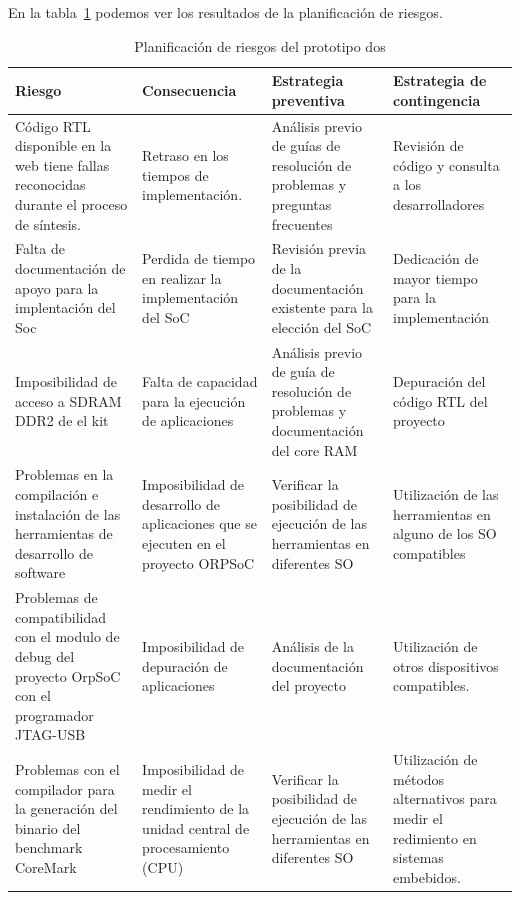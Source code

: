 En la tabla~\ref{tab:planificación2} podemos ver los resultados de la planificación de riesgos.
\clearpage
 		\begin{table}[h!]
		\centering
		\begin{tabular}{ p{4cm} p{4cm} p{4cm} p{3cm} }
		\hline 
		\rowcolor[gray]{0.8} Riesgo & Consecuencia & Estrategia preventiva & Estrategia de contingencia\\
		\hline
	Código RTL disponible en la web tiene fallas reconocidas durante el proceso de síntesis.&Retraso en los tiempos de implementación.& Análisis previo de guías de resolución de problemas y preguntas frecuentes & Revisión de código y consulta a los desarrolladores \\		 
		\hline
		Falta de documentación de apoyo para la implentación
del Soc& Perdida de tiempo en realizar la implementación
del SoC & Revisión previa de la documentación existente para la elección del
SoC & Dedicación de mayor tiempo para la implementación\\ 
		\hline
		 Imposibilidad de acceso a SDRAM DDR2 de el kit & Falta de capacidad para la ejecución de aplicaciones & Análisis previo de guía de resolución de problemas y documentación del core RAM & Depuración del código RTL del proyecto\\
		\hline
		Problemas en la compilación e instalación de las herramientas de desarrollo de software & Imposibilidad de desarrollo de aplicaciones que se ejecuten en el proyecto ORPSoC & Verificar la posibilidad de ejecución de las herramientas en diferentes SO & Utilización de las herramientas en alguno de los SO compatibles\\			
		\hline
		Problemas de compatibilidad con el modulo de debug del proyecto OrpSoC con el programador JTAG-USB & Imposibilidad de depuración de aplicaciones &Análisis de la documentación del proyecto& Utilización de otros  dispositivos compatibles.\\		
		\hline
		Problemas con el compilador para la generación del binario del benchmark CoreMark & Imposibilidad de medir el rendimiento de la unidad central de procesamiento (CPU) & Verificar la posibilidad de ejecución de las herramientas en diferentes SO & Utilización de métodos alternativos para medir el redimiento en sistemas embebidos.\\
		\hline
		\end{tabular}
		\caption{Planificación de riesgos del prototipo dos}
		\label{tab:planificación2}
		\end{table}




